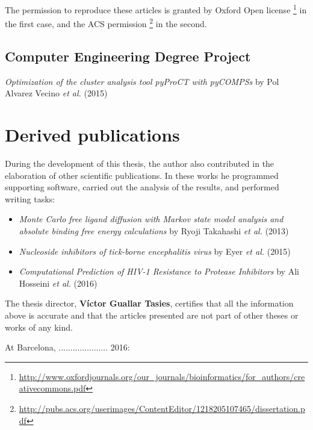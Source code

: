 The permission to reproduce these articles is granted by Oxford Open license \footnote{\url{ http://www.oxfordjournals.org/our_journals/bioinformatics/for_authors/creativecommons.pdf}} in the first case, and the ACS permission \footnote{\url{http://pubs.acs.org/userimages/ContentEditor/1218205107465/dissertation.pdf}} in the second.

\subsection{Computer Engineering Degree Project}
\textit{Optimization of the cluster analysis tool pyProCT with pyCOMPSs} by Pol Alvarez Vecino \textit{et al.} \cite{alvarez_vecino_optimization_2015} (2015)

\section{Derived publications}
During the development of this thesis, the author also contributed in the elaboration of other scientific publications. In these works he programmed supporting software, carried out the analysis of the results, and performed writing tasks:

\begin{itemize}
\item \textit{Monte Carlo free ligand diffusion with Markov state model analysis and absolute binding free energy calculations} by Ryoji Takahashi \textit{et al.} \cite{takahashi_monte_2014-1} (2013)

\item \textit{Nucleoside inhibitors of tick-borne encephalitis virus} by Eyer \textit{et al.} \cite{eyer_nucleoside_2015} (2015)

\item \textit{Computational Prediction of HIV-1 Resistance to Protease Inhibitors} by Ali Hosseini \textit{et al.} \cite{ali_comp_pred_hiv_2016} (2016) 
\end{itemize} 

The thesis director, \textbf{V\'ictor Guallar Tasies}, certifies that all the information above is accurate and that the articles presented are not part of other theses or works of any kind. 

\begin{flushright}
At Barcelona, .....................  2016:
\end{flushright}


\newpage


\newpage
\cleardoublepage

\newpage
\cleardoublepage


\newpage
\cleardoublepage

\newpage
\cleardoublepage


\newpage
\cleardoublepage

\newpage
\cleardoublepage
